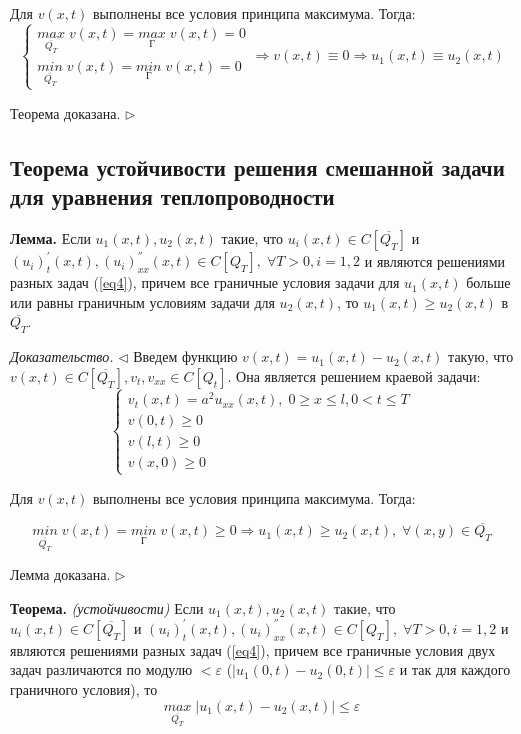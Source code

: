 \documentclass[11pt,a4paper]{article}
\begin{document}
    Для $v(x,t)$ выполнены все условия принципа максимума. Тогда:
    $$
    \begin{cases}
        \underset{\overline{Q_T}}{max} \; v(x,t) = \underset{Г}{max} \; v(x,t) = 0 \\
        \underset{\overline{Q_T}}{min} \; v(x,t) = \underset{Г}{min} \; v(x,t) = 0
    \end{cases}
    \Rightarrow v(x,t) \equiv 0 \Rightarrow u_1(x,t) \equiv u_2(x,t)
    $$
    
    Теорема доказана. $\triangleright$
    
    \subsection{Теорема устойчивости решения смешанной задачи для уравнения теплопроводности}
    \textbf{Лемма.} Если $u_1(x,t),u_2(x,t)$ такие, что $u_i(x,t) \in C[\overline{Q_T}]$ и $(u_i)_{t}^{'}(x,t),(u_i)_{xx}^{''}(x,t) \in C[Q_T], \; \forall T > 0, i = 1,2$ и являются решениями разных задач (\ref{eq4}), причем все граничные условия задачи для $u_1(x,t)$ больше или равны граничным условиям задачи для $u_2(x,t)$, то $u_1(x,t) \geqslant u_2(x,t)$ в $\overline{Q_T}$.
    
    \textit{Доказательство.} $\triangleleft$ Введем функцию $v(x,t) = u_1(x,t) - u_2(x,t)$ такую, что $v(x,t) \in C[\overline{Q_T}], v_t, v_{xx} \in C[Q_t]$. Она является решением краевой задачи:
    $$
    \begin{cases}
        v_t(x,t) = a^2u_{xx}(x,t), \; 0 \geqslant x \leqslant l, 0 < t \leqslant T \\
        v(0, t) \geqslant 0 \\
        v(l, t) \geqslant 0 \\
        v(x, 0) \geqslant 0
    \end{cases}
    $$
    
    Для $v(x,t)$ выполнены все условия принципа максимума. Тогда:
    
    $$
    \underset{\overline{Q_T}}{min} \; v(x,t) = \underset{Г}{min} \; v(x,t) \geqslant 0 \Rightarrow u_1(x,t) \geqslant u_2(x,t), \; \forall (x,y) \in \overline{Q_T}
    $$
    
    Лемма доказана. $\triangleright$
    \par
    \textbf{Теорема.} \textit{(устойчивости)} Если $u_1(x,t),u_2(x,t)$ такие, что $u_i(x,t) \in C[\overline{Q_T}]$ и $(u_i)_{t}^{'}(x,t),(u_i)_{xx}^{''}(x,t) \in C[Q_T], \; \forall T > 0, i = 1,2$ и являются решениями разных задач (\ref{eq4}), причем все граничные условия двух задач различаются по модулю $< \varepsilon$ ($|u_1(0,t) - u_2(0,t)| \leqslant \varepsilon$ и так для каждого граничного условия), то 
    $$
    \underset{\overline{Q_T}}{max} \; |u_1(x,t) - u_2(x,t)| \leqslant \varepsilon
    $$
    
\end{document}
